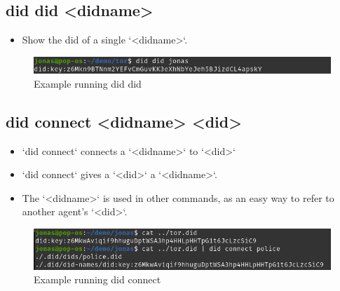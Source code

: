 \subsection{did did <didname>}
\begin{itemize}
\item Show the did of a single `<didname>`.
\end{itemize}
    \begin{figure}[htbp]
      \centering
      \includegraphics[width=.7\textwidth]{figures/cmd-did.png}
      \caption[]{Example running did did}
    \end{figure}



\subsection{did connect <didname> <did>}
\begin{itemize}
\item `did connect` connects a `<didname>` to `<did>`
\item `did connect` gives a `<did>` a `<didname>`.
\item The `<didname>` is used in other commands, as an easy way to refer to another agent's `<did>`.
\end{itemize}
    \begin{figure}[htbp]
      \centering
      \includegraphics[width=.7\textwidth]{figures/cmd-connect.png}
      \caption[]{Example running did connect}
    \end{figure}



